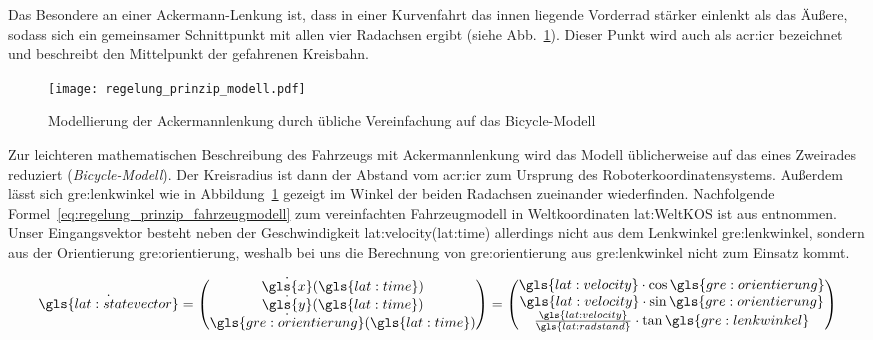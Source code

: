 Das Besondere an einer Ackermann-Lenkung ist, dass in einer Kurvenfahrt das innen liegende Vorderrad stärker einlenkt als das Äußere, sodass sich ein gemeinsamer Schnittpunkt mit allen vier Radachsen ergibt (siehe Abb.~\ref{fig:regelung_prinzip_modell}). Dieser Punkt wird auch als \gls{acr:icr} bezeichnet und beschreibt den Mittelpunkt der gefahrenen Kreisbahn. 

\begin{figure}[H] %
  \centering
  \texttt{[image: regelung\_prinzip\_modell.pdf]}
  \caption{Modellierung der Ackermannlenkung durch übliche Vereinfachung auf das Bicycle-Modell}
  \label{fig:regelung_prinzip_modell}
\end{figure}

Zur leichteren mathematischen Beschreibung des Fahrzeugs mit Ackermannlenkung wird das Modell üblicherweise auf das eines Zweirades reduziert (\emph{Bicycle-Modell}). Der Kreisradius ist dann der Abstand vom \gls{acr:icr} zum Ursprung des Roboterkoordinatensystems. Außerdem lässt sich \gls{gre:lenkwinkel} wie in Abbildung~\ref{fig:regelung_prinzip_modell} gezeigt im Winkel der beiden Radachsen zueinander wiederfinden. Nachfolgende Formel~\eqref{eq:regelung_prinzip_fahrzeugmodell} zum vereinfachten Fahrzeugmodell in Weltkoordinaten \gls{lat:WeltKOS} ist aus \autocite{corkeRoboticsVisionControl2017} entnommen. Unser Eingangsvektor besteht neben der Geschwindigkeit \gls{lat:velocity}(\gls{lat:time}) allerdings nicht aus dem Lenkwinkel \gls{gre:lenkwinkel}, sondern aus der Orientierung \gls{gre:orientierung}, weshalb bei uns die Berechnung von \gls{gre:orientierung} aus \gls{gre:lenkwinkel} nicht zum Einsatz kommt. 

\begin{equation}
\dot{\gls{lat:statevector}} = 
\begin{pmatrix}
\dot{\gls{x}}(\gls{lat:time}) 	\\
\dot{\gls{y}}(\gls{lat:time})	\\
\dot{\gls{gre:orientierung}}(\gls{lat:time})    	\\
\end{pmatrix}
=
\begin{pmatrix}
\gls{lat:velocity} \cdot \cos \gls{gre:orientierung} 	\\
\gls{lat:velocity} \cdot \sin \gls{gre:orientierung} 	\\
\frac{\gls{lat:velocity}}{\gls{lat:radstand}} \cdot \tan \gls{gre:lenkwinkel}    	\\
\end{pmatrix}
\label{eq:regelung_prinzip_fahrzeugmodell}
\end{equation} 

